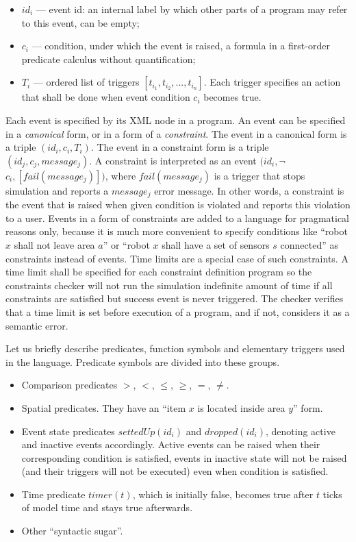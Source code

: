 \documentclass[conference]{IEEEtran}
\begin{document}
\begin{itemize}
    \item $id_i$ --- event id: an internal label by which other parts of a program may refer to this event, can be empty;
    \item $c_i$ --- condition, under which the event is raised, a formula in a first-order predicate calculus without quantification;
    \item $T_i$ --- ordered list of triggers $[ t_{i_1}, t_{i_2}, ..., t_{i_n} ]$. Each trigger specifies an action that shall be done when event condition $c_i$ becomes true.
\end{itemize}

Each event is specified by its XML node in a program. An event can be specified in a \textit{canonical} form, or in a form of a \textit{constraint}. The event in a canonical form is a triple $(id_i, c_i, T_i)$. The event in a constraint form is a triple $(id_j, c_j, message_j)$. A constraint is interpreted as an event $(id_i, $$\neg$$c_i, [ fail(message_j) ])$, where $fail(message_j)$ is a trigger that stops simulation and reports a $message_j$ error message. In other words, a constraint is the event that is raised when given condition is violated and reports this violation to a user. Events in a form of constraints are added to a language for pragmatical reasons only, because it is much more convenient to specify conditions like ``robot $x$ shall not leave area $a$'' or ``robot $x$ shall have a set of sensors $s$ connected'' as constraints instead of events. Time limits are a special case of such constraints. A time limit shall be specified for each constraint definition program so the constraints checker will not run the simulation indefinite amount of time if all constraints are satisfied but success event is never triggered. The checker verifies that a time limit is set before execution of a program, and if not, considers it as a semantic error.

Let us briefly describe predicates, function symbols and elementary triggers used in the language. Predicate symbols are divided into these groups.
\begin{itemize}
    \item Comparison predicates $>$, $<$, $\leq$, $\geq$, $=$, $\neq$.
    \item Spatial predicates. They have an ``item $x$ is located inside area $y$'' form.
    \item Event state predicates $settedUp(id_i)$ and $dropped(id_i)$, denoting active and inactive events accordingly. Active events can be raised when their corresponding condition is satisfied, events in inactive state will not be raised (and their triggers will not be executed) even when condition is satisfied.
    \item Time predicate $timer(t)$, which is initially false, becomes true after $t$ ticks of model time and stays true afterwards.
    \item Other ``syntactic sugar''.
\end{itemize}
\end{document}
